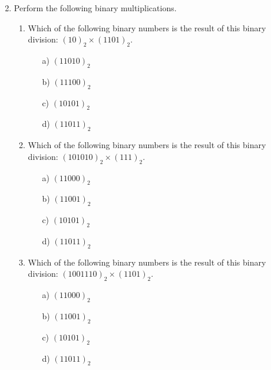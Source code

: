 \documentclass[]{article}
\begin{document}
\begin{enumerate}
\begin{multicols}{2}
	
	

	\end{multicols}
	
	\newpage
	
	\item Perform the following binary multiplications.
	
	\begin{enumerate}
		\item Which of the following binary numbers is the result of this binary division: $(10)_{2} \times ( 1101)_{2}$. %
		\begin{multicols}{2}
			\begin{itemize}
				\item[a)] $(11010)_{2}$ %
				\item[b)] $(11100)_{2}$ %
				\item[c)] $(10101)_{2}$ %
				\item[d)] $(11011)_2$ %
			\end{itemize}
		\end{multicols}
		\item Which of the following binary numbers is the result of this binary division: $(101010)_{2} \times( 111 )_{2}$. %
		\begin{multicols}{2}
			\begin{itemize}
				\item[a)] $(11000)_{2}$ %
				\item[b)] $(11001)_{2}$ %
				\item[c)] $(10101)_{2}$ %
				\item[d)] $(11011)_2$ %
			\end{itemize}
		\end{multicols}
		\item Which of the following binary numbers is the result of this binary division: $(1001110)_{2}\times ( 1101 )_{2}$. %
		\begin{multicols}{2}
			\begin{itemize}
				\item[a)] $(11000)_{2}$ %
				\item[b)] $(11001)_{2}$ %
				\item[c)] $(10101)_{2}$ %
				\item[d)] $(11011)_2$ %
			\end{itemize}
		\end{multicols}
	\end{enumerate}
	

\end{enumerate}
\end{document}

